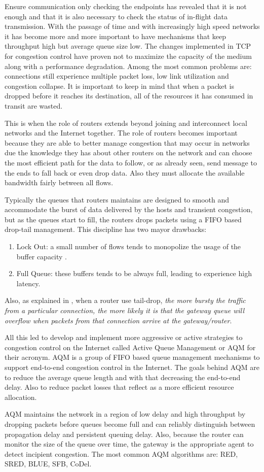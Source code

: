 Ensure communication only checking the endpoints has revealed that it is not
enough and that it is also necessary to check the status of in-flight data
transmission. With the passage of time and with increasingly high speed
networks it has become more and more important to have mechanisms that keep
throughput high but average queue size low. The changes implemented in TCP for
congestion control have proven not to maximize the capacity of the medium
along with a performance degradation. Among the most common problems are:
connections still experience multiple packet loss, low link utilization and
congestion collapse. It is important to keep in mind that when a packet is
dropped before it reaches its destination, all of the resources it has
consumed in transit are wasted.

This is when the role of routers extends beyond joining and interconnect local
networks and the Internet together. The role of routers becomes important
because they are able to better manage congestion that may occur in networks
due the knowledge they has about other routers on the network and can choose
the most efficient path for the data to follow, or as already seen, send
message to the ends to fall back or even drop data. Also they must allocate
the available bandwidth fairly between all flows.

Typically the queues that routers maintains are designed to smooth and
accommodate the burst of data delivered by the hosts and transient congestion,
but as the queues start to fill, the routers drops packets using a FIFO based
drop-tail management. This discipline has two mayor drawbacks:
\begin{enumerate}
\item Lock Out: a small number of flows tends to monopolize the usage of the
buffer capacity\cite{evolvshortlongflows} .
\item Full Queue: these buffers tends to be always full, leading to experience 
high latency.
\end{enumerate}

Also, as explained in \cite{FloydJacobsonRED}, when a router use tail-drop,
\textit{the more bursty the traffic from a particular connection, the more
likely it is that the gateway queue will overflow when packets from that
connection arrive at the gateway/router}.

All this led to develop and implement more aggressive or active strategies to
congestion control on the Internet called Active Queue Management or AQM for
their acronym. AQM is a group of FIFO based queue management mechanisms to
support end-to-end congestion control in the Internet. The goals behind AQM
are to reduce the average queue length and with that decreasing the end-to-end
delay. Also to reduce packet losses that reflect as a more efficient resource
allocation.

AQM maintains the network in a region of low delay and high throughput by
dropping packets before queues become full and can reliably distinguish
between propagation delay and persistent queuing delay. Also, because the
router can monitor the size of the queue over time, the gateway is the
appropriate agent to detect incipient congestion. The most common AQM
algorithms are: RED, SRED, BLUE, SFB, CoDel.
